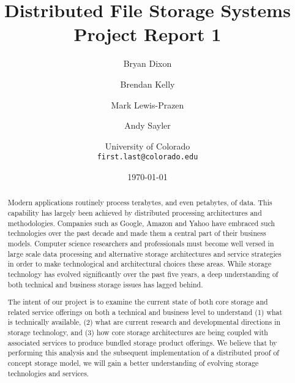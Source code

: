 \documentclass[11pt]{article}
\begin{document}
\title{
  Distributed File Storage Systems\\
  Project Report 1
}
\author{
  Bryan Dixon \and Brendan Kelly \and Mark Lewis-Prazen \and Andy Sayler\\
  \and University of Colorado\\
  \texttt{first.last@colorado.edu}
}
\date{\today}

\maketitle

\begin{abstract}
Modern applications routinely process
terabytes, and even petabytes, of data. This capability has largely been
achieved by distributed processing architectures and methodologies.
Companies such as Google, Amazon and Yahoo have embraced such
technologies over the past decade and made them a
central part of their business models. 
Computer science researchers and professionals must become well versed
in large scale data processing and alternative storage architectures
and service strategies in order to make technological and
architectural choices these areas. While storage technology has
evolved significantly over the past five years, a deep understanding
of both technical and business storage issues has lagged behind.

The intent of our project is to examine the current state of both core
storage and related service offerings on both a technical and business
level to understand (1) what is technically available, (2) what are
current research and developmental directions in storage technology,
and (3) how core storage architectures are being coupled with
associated services to produce bundled storage product offerings.
We believe that
by performing this analysis and the subsequent implementation of a
distributed proof of concept storage model, we will gain a better
understanding of evolving storage technologies and services.

\end{abstract}

\newpage
\end{document}

